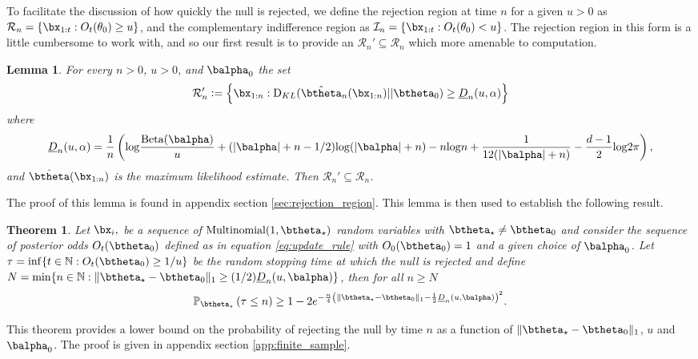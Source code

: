 \documentclass[11pt]{article}
\def\log{{\rm log}}
\newcommand{\Beta}{\mathrm{Beta}}
\newcommand{\KL}{\mathrm{D}_{KL}}
\newtheorem{thm}{Theorem}[section]
\newtheorem{lemma}{Lemma}[section]
\newcommand{\df}{\vcentcolon=}
\begin{document}
To facilitate the discussion of how quickly the null is rejected, we define the rejection region at time $n$ for a given $u>0$ as $\mathcal{R}_n = \{ \bx_{1:t} : O_t(\theta_0) \geq u \}$,
and the complementary indifference region as $\mathcal{I}_n = \{ \bx_{1:t} : O_t(\theta_0) < u \}$. 
The rejection region in this form is a little cumbersome to work with,
and so our first result is to provide an $\mathcal R_n'\subseteq \mathcal R_n$ which more amenable to computation.
\begin{lemma}\label{thm:calRprime}
  For every $n>0$, $u>0$, and $\balpha_0$ the set
  \begin{equation}
    \label{eq:decision_boundary}
    \mathcal R_n'\df 
    \left\{
      \bx_{1:n} :
      \KL(\hat\btheta_n(\bx_{1:n})|| \btheta_0)
      \geq \underline{D}_n(u,\alpha) 
    \right\} 
  \end{equation}
  where
  \begin{equation*}
    \underline{D}_n(u,\alpha) = \frac{1}{n}\left( \log \frac{\Beta(\balpha)}{u} +(|\balpha|+n-1/2)\log(|\balpha|+n)-n\log n + \frac{1}{12(|\balpha|+n)} - \frac{d-1}{2}\log 2\pi\right),
  \end{equation*}
  and $\hat{\btheta}(\bx_{1:n})$ is the maximum likelihood estimate.
Then $\mathcal{R}_n'  \subseteq \mathcal R_n$.
\end{lemma}
The proof of this lemma is found in appendix section \ref{sec:rejection_region}.
This lemma is then used to establish the following result.


\begin{thm}
  \label{thm:finite_sample}
\noindent Let $\bx_i,$ be a sequence of $\text{Multinomial}(1,\btheta_{\star})$ random variables with $\btheta_{\star} \neq \btheta_0$ and consider the sequence of posterior odds $O_t(\btheta_0)$ defined as in equation \eqref{eq:update_rule} with $O_0(\btheta_0)=1$ and a given choice of $\balpha_0$.
Let $\tau = \inf \lbrace t \in \mathbb{N}: O_t(\btheta_0) \geq 1/u \rbrace$ be the random stopping time at which the null is rejected and define $N = \min \{n \in \mathbb{N} : \|\btheta_\star - \btheta_0\|_1 \geq (1/2)\underline{D}_n(u,\balpha)\}$, then for all $n\geq N$
\begin{equation}
  \label{eq:finite_sample}
\mathbb{P}_{\btheta_{\star}}\left( \tau \leq  n \right) \geq
 1 -2e^{-\frac{n}{4}\left(\|\btheta_\star - \btheta_0\|_1-\frac{1}{2}\underline{D}_n(u,\balpha)\right)^2}.
\end{equation}
\end{thm}
\noindent This theorem provides a lower bound on the probability of rejecting the null by time $n$ as a function of $\|\btheta_\star - \btheta_0\|_1$, $u$ and $\balpha_0$.
The proof is given in appendix section \ref{app:finite_sample}. 
\end{document}

